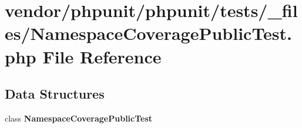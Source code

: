 \section{vendor/phpunit/phpunit/tests/\+\_\+files/\+Namespace\+Coverage\+Public\+Test.php File Reference}
\label{phpunit_2tests_2__files_2_namespace_coverage_public_test_8php}
\subsection*{Data Structures}
\begin{DoxyCompactItemize}
\item 
class {\bf Namespace\+Coverage\+Public\+Test}
\end{DoxyCompactItemize}
